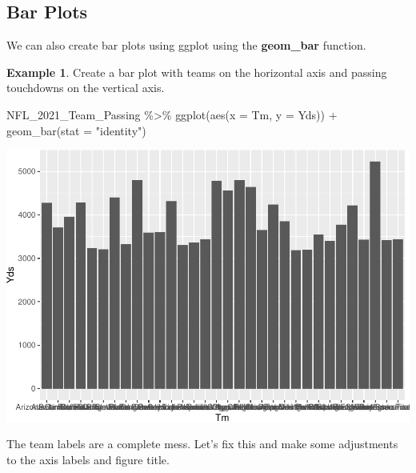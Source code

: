 \documentclass[
  11pt,
]{book}
\newenvironment{Shaded}{\begin{snugshade}}{\end{snugshade}}
\newcommand{\AttributeTok}[1]{\textcolor[rgb]{0.77,0.63,0.00}{#1}}
\newcommand{\FunctionTok}[1]{\textcolor[rgb]{0.00,0.00,0.00}{#1}}
\newcommand{\NormalTok}[1]{#1}
\newcommand{\SpecialCharTok}[1]{\textcolor[rgb]{0.00,0.00,0.00}{#1}}
\newcommand{\StringTok}[1]{\textcolor[rgb]{0.31,0.60,0.02}{#1}}
\theoremstyle{definition}
\theoremstyle{definition}
\newtheorem{example}{Example}[chapter]
\theoremstyle{definition}
\theoremstyle{definition}
\theoremstyle{remark}
\begin{document}
\vfill
\newpage

\hypertarget{bar-plots}{%
\subsection{Bar Plots}\label{bar-plots}}

We can also create bar plots using ggplot using the \textbf{geom\_bar} function.

\begin{example}
Create a bar plot with teams on the horizontal axis and passing touchdowns on the vertical axis.

\begin{Shaded}
\begin{Highlighting}[]
\NormalTok{NFL\_2021\_Team\_Passing }\SpecialCharTok{\%\textgreater{}\%}
    \FunctionTok{ggplot}\NormalTok{(}\FunctionTok{aes}\NormalTok{(}\AttributeTok{x =}\NormalTok{ Tm, }\AttributeTok{y =}\NormalTok{ Yds)) }\SpecialCharTok{+} \FunctionTok{geom\_bar}\NormalTok{(}\AttributeTok{stat =} \StringTok{"identity"}\NormalTok{)}
\end{Highlighting}
\end{Shaded}

\includegraphics{series_files/figure-latex/bar-1.pdf}

\vfill
\newpage

The team labels are a complete mess. Let's fix this and make some adjustments to the axis labels and figure title.


\end{example}
\end{document}
